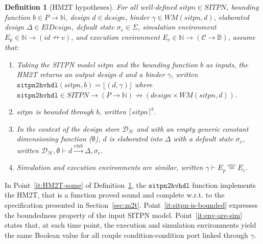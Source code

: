 \documentclass[pdflatex,sn-mathphys]{sn-jnl}%
\theoremstyle{thmstyleone}%
\theoremstyle{thmstyletwo}%
\theoremstyle{thmstylethree}%
\newtheorem{definition}{Definition}%
\begin{document}
\begin{definition}[HM2T hypotheses]
  \label{def:hm2t-hyps}
  For all well-defined $sitpn\in{}SITPN$, bounding function
  $b\in{}P\rightarrow\mathbb{N}$, \hvhdl{} design $d\in{}design$,
  binder $\gamma\in{}WM(sitpn,d)$, elaborated design
  $\Delta\in{}ElDesign$, default state $\sigma_e\in\Sigma$, simulation
  environment $E_p\in\mathbb{N}\rightarrow{}(id\nrightarrow{}v)$, and
  execution environment
  $E_c\in\mathbb{N}\rightarrow(\mathcal{C}\rightarrow\mathbb{B})$,
  assume that:
  \begin{enumerate}
  \item\label{it:HM2T-some} Taking the SITPN model $sitpn$ and the
    bounding function $b$ as inputs, the HM2T returns an output design
    $d$ and a binder $\gamma$, written
    $\mathtt{sitpn2hvhdl}(sitpn, b)=\lfloor(d,\gamma)\rfloor$ where
    $\mathtt{sitpn2hvhdl}\in{}SITPN\rightarrow(P\rightarrow\mathbb{N})\nrightarrow(design\times{}WM(sitpn,d))$.
  \item\label{it:sitpn-is-bounded} $sitpn$ is bounded through $b$,
    written $\lceil{}sitpn\rceil^b$.
  \item In the context of the \hilecop{} design store
    $\mathcal{D}_\mathcal{H}$ and with an empty generic constant
    dimensioning function ($\emptyset$), $d$ is elaborated into
    $\Delta$ with a default state $\sigma_e$, written
    $\mathcal{D}_\mathcal{H},\emptyset\vdash{}d\xrightarrow{elab}\Delta,\sigma_e$.
  \item\label{it:env-are-sim} Simulation and execution environments
    are similar, written $\gamma\vdash{}E_p\stackrel{env}{=}E_c$.
  \end{enumerate}
  
\end{definition}

In Point~\ref{it:HM2T-some} of Definition~\ref{def:hm2t-hyps}, the
$\mathtt{sitpn2hvhdl}$ function implements the HM2T, that is a
function proved sound and complete w.r.t. to the specification
presented in Section~\ref{sec:m2t}. Point~\ref{it:sitpn-is-bounded}
expresses the boundedness property of the input SITPN
model. Point~\ref{it:env-are-sim} states that, at each time point, the
execution and simulation environments yield the same Boolean value for
all couple condition-condition port linked through $\gamma$.

\def\hm2thyps{well-defined $sitpn\in{}SITPN$,
  $b\in{}P\rightarrow\mathbb{N}$, $d\in{}design$,
  $\gamma\in{}WM(sitpn,d)$, $\Delta\in{}ElDesign,\sigma_{e}\in\Sigma$,
  $E_p\in\mathbb{N}\rightarrow{}(id\nrightarrow{}v)$, and
  $E_c\in\mathbb{N}\rightarrow(\mathcal{C}\rightarrow\mathbb{B})$ that
  verify the hypotheses of Definition~\ref{def:hm2t-hyps}}
\end{document}

